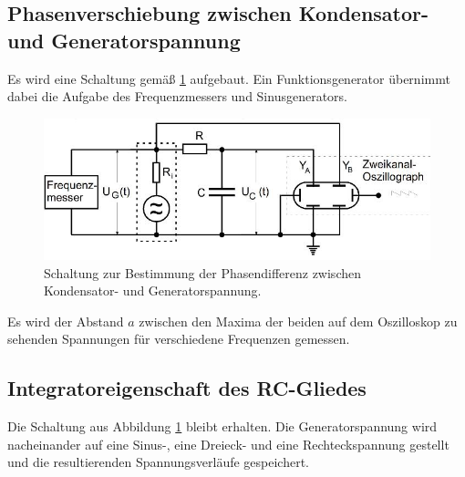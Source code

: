 \subsection{Phasenverschiebung zwischen Kondensator- und Generatorspannung}
Es wird eine Schaltung gemäß \ref{fig:c}
aufgebaut. Ein Funktionsgenerator übernimmt dabei die Aufgabe des Frequenzmessers und Sinusgenerators.
\begin{figure}
\centering
\includegraphics[width=\linewidth-70pt,height=\textheight-70pt,keepaspectratio]{content/images/c.jpg}
\caption{Schaltung zur Bestimmung der Phasendifferenz zwischen Kondensator- und Generatorspannung.\cite{V353}}
\label{fig:c}
\end{figure}
\newline Es wird der Abstand $a$ zwischen den Maxima der beiden auf dem Oszilloskop zu sehenden Spannungen für verschiedene Frequenzen gemessen.
\subsection{Integratoreigenschaft des RC-Gliedes}
Die Schaltung aus Abbildung \ref{fig:c} bleibt erhalten.
Die Generatorspannung wird nacheinander auf eine Sinus-, eine Dreieck- und eine Rechteckspannung gestellt und die resultierenden Spannungsverläufe gespeichert.